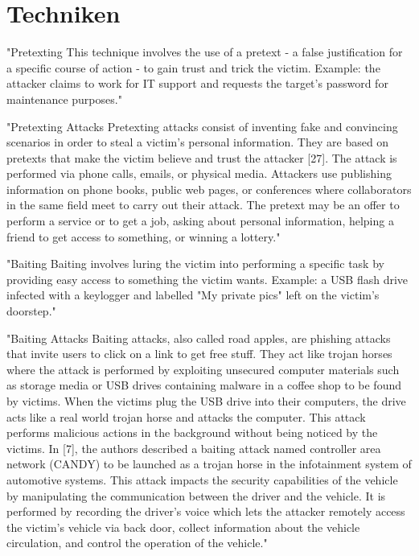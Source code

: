 \section{Techniken}


"Pretexting
This technique involves the use of a pretext -  a false justification for a specific course of action - to gain
trust and trick the victim.
Example: the attacker claims to work for IT support and requests the target's password for maintenance purposes."\cite{1_enisa}

"Pretexting Attacks
Pretexting attacks consist of inventing fake and convincing scenarios in order to steal a victim’s personal information.
They are based on pretexts that make the victim believe and trust the attacker [27]. The attack is performed via phone calls,
emails, or physical media. Attackers use publishing information on phone books, public web pages, or conferences where collaborators
in the same field meet to carry out their attack. The pretext may be an offer to perform a service or to get a job,
asking about personal information, helping a friend to get access to something, or winning a lottery."\cite{4_mdpi}

"Baiting
Baiting involves luring the victim into performing a specific task by providing easy access to something the victim wants.  
Example: a USB flash drive infected with a keylogger and labelled "My private pics" left on the victim's doorstep."\cite{1_enisa}

"Baiting Attacks
Baiting attacks, also called road apples, are phishing attacks that invite users to click on a link to get free stuff.
They act like trojan horses where the attack is performed by exploiting unsecured computer materials such as storage media
or USB drives containing malware in a coffee shop to be found by victims. When the victims plug the USB drive into their computers,
the drive acts like a real world trojan horse and attacks the computer. This attack performs malicious actions in the background
without being noticed by the victims.
In [7], the authors described a baiting attack named controller area network (CANDY) to be launched as a trojan horse in
the infotainment system of automotive systems. This attack impacts the security capabilities of the vehicle by manipulating the
communication between the driver and the vehicle. It is performed by recording the driver’s voice which lets the attacker remotely
access the victim’s vehicle via back door, collect information about the vehicle circulation, and control the operation of the vehicle."\cite{4_mdpi}

